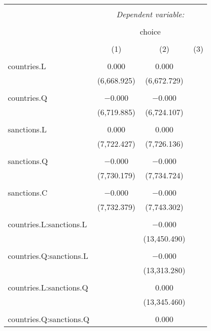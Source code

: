 
\begin{table}[!htbp] \centering 
  \caption{} 
  \label{} 
\begin{tabular}{@{\extracolsep{5pt}}lccc} 
\\[-1.8ex]\hline 
\hline \\[-1.8ex] 
 & \multicolumn{3}{c}{\textit{Dependent variable:}} \\ 
\cline{2-4} 
\\[-1.8ex] & \multicolumn{3}{c}{choice} \\ 
\\[-1.8ex] & (1) & (2) & (3)\\ 
\hline \\[-1.8ex] 
 countries.L & 0.000 & 0.000 &  \\ 
  & (6,668.925) & (6,672.729) &  \\ 
  & & & \\ 
 countries.Q & $-$0.000 & $-$0.000 &  \\ 
  & (6,719.885) & (6,724.107) &  \\ 
  & & & \\ 
 sanctions.L & 0.000 & 0.000 &  \\ 
  & (7,722.427) & (7,726.136) &  \\ 
  & & & \\ 
 sanctions.Q & $-$0.000 & $-$0.000 &  \\ 
  & (7,730.179) & (7,734.724) &  \\ 
  & & & \\ 
 sanctions.C & $-$0.000 & $-$0.000 &  \\ 
  & (7,732.379) & (7,743.302) &  \\ 
  & & & \\ 
 countries.L:sanctions.L &  & $-$0.000 &  \\ 
  &  & (13,450.490) &  \\ 
  & & & \\ 
 countries.Q:sanctions.L &  & $-$0.000 &  \\ 
  &  & (13,313.280) &  \\ 
  & & & \\ 
 countries.L:sanctions.Q &  & 0.000 &  \\ 
  &  & (13,345.460) &  \\ 
  & & & \\ 
 countries.Q:sanctions.Q &  & 0.000 &  \\ 

\end{tabular}
\end{table}
